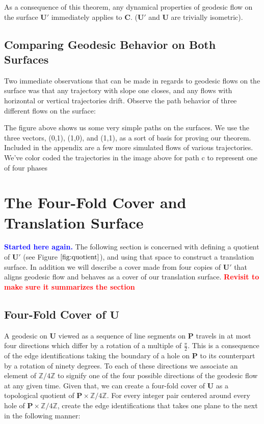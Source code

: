 \documentclass[]{article}
\newcommand{\compav}[1]{\textbf{\textcolor{blue}{#1}}}
\newcommand{\compat}[1]{\textbf{\textcolor{red}{#1}}}
\begin{document}
As a consequence of this theorem, any dynamical properties of geodesic flow on the surface $\mathbf{U}'$ immediately applies to $\mathbf{C}$. ($\mathbf{U}'$ and $\mathbf{U}$ are trivially isometric).

\subsection{Comparing Geodesic Behavior on Both Surfaces}
Two immediate observations that can be made in regards to geodesic flows on the surface was that any trajectory with slope one closes, and any flows with horizontal or vertical trajectories drift. Observe the path behavior of three different flows on the surface:



The figure above shows us some very simple paths on the surfaces. We use the three vectors, (0,1), (1,0), and (1,1), as a sort of basis for proving our theorem. Included in the appendix are a few more simulated flows of various trajectories. We've color coded the trajectories in the image above for path c to represent one of four phases

\newpage
\section{The Four-Fold Cover and Translation Surface}
\compav{Started here again.}
The following section is concerned with defining a quotient of $\mathbf{U}'$ (see Figure $\ref{fig:quotient}$), and using that space to construct a translation surface. In addition we will describe a cover made from four copies of $\mathbf{U}'$ that aligns geodesic flow and behaves as a cover of our translation surface. \compat{Revisit to make sure it summarizes the section}


\subsection{Four-Fold Cover of $\mathbf{U}$}
A geodesic on $\mathbf{U}$ viewed as a sequence of line segments on $\mathbf{P}$ travels in at most four directions which differ by a rotation of a multiple of $\frac{\pi}{2}$. This is a consequence of the edge identifications taking the boundary of a hole on $\mathbf{P}$ to its counterpart by a rotation of ninety degrees. To each of these directions we associate an element of $\mathbb{Z}/4\mathbb{Z}$ to signify one of the four possible directions of the geodesic flow at any given time. Given that, we can create a four-fold cover of $\mathbf{U}$ as a topological quotient of $\mathbf{P}\times\mathbb{Z}/4\mathbb{Z}$. For every integer pair centered around every hole of $\mathbf{P}\times\mathbb{Z}/4\mathbb{Z}$, create the edge identifications that takes one plane to the next in the following manner:
\end{document}
